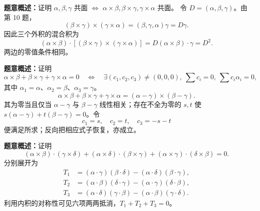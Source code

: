 \textbf{题意概述：}证明 $\alpha,\beta,\gamma$ 共面 $\Leftrightarrow$ $\alpha\times\beta,\beta\times\gamma,\gamma\times\alpha$ 共面。
令 $D=(\alpha,\beta,\gamma)$。由第 10 题，
\[
(\beta\times\gamma)\times(\gamma\times\alpha)
=(\beta,\gamma,\alpha)\gamma=D\gamma.
\]
因此三个外积的混合积为
\[
(\alpha\times\beta)\cdot[(\beta\times\gamma)\times(\gamma\times\alpha)]
=D(\alpha\times\beta)\cdot\gamma=D^2.
\]
两边的零值条件相同。

\textbf{题意概述：}证明
\[
\alpha\times\beta+\beta\times\gamma+\gamma\times\alpha=0
\quad\Longleftrightarrow\quad
\exists(c_1,c_2,c_3)\ne(0,0,0),\ \sum c_i=0,\ \sum c_i\alpha_i=0,
\]
其中 $\alpha_1=\alpha$、$\alpha_2=\beta$、$\alpha_3=\gamma$。
\[
\alpha\times\beta+\beta\times\gamma+\gamma\times\alpha
=(\alpha-\gamma)\times(\beta-\gamma).
\]
其为零当且仅当 $\alpha-\gamma$ 与 $\beta-\gamma$ 线性相关；存在不全为零的 $s,t$ 使 $s(\alpha-\gamma)+t(\beta-\gamma)=0$。令
\[
c_1=s,\quad c_2=t,\quad c_3=-s-t
\]
便满足所求；反向把相应式子恢复，亦成立。

\textbf{题意概述：}证明
\[
(\alpha\times\beta)\cdot(\gamma\times\delta)
+(\alpha\times\delta)\cdot(\beta\times\gamma)
+(\alpha\times\gamma)\cdot(\delta\times\beta)=0.
\]
分别展开为
\begin{align*}
T_1&=(\alpha\cdot\gamma)(\beta\cdot\delta)-(\alpha\cdot\delta)(\beta\cdot\gamma),\\
T_2&=(\alpha\cdot\beta)(\delta\cdot\gamma)-(\alpha\cdot\gamma)(\delta\cdot\beta),\\
T_3&=(\alpha\cdot\delta)(\gamma\cdot\beta)-(\alpha\cdot\beta)(\gamma\cdot\delta).
\end{align*}
利用内积的对称性可见六项两两抵消，$T_1+T_2+T_3=0$。
